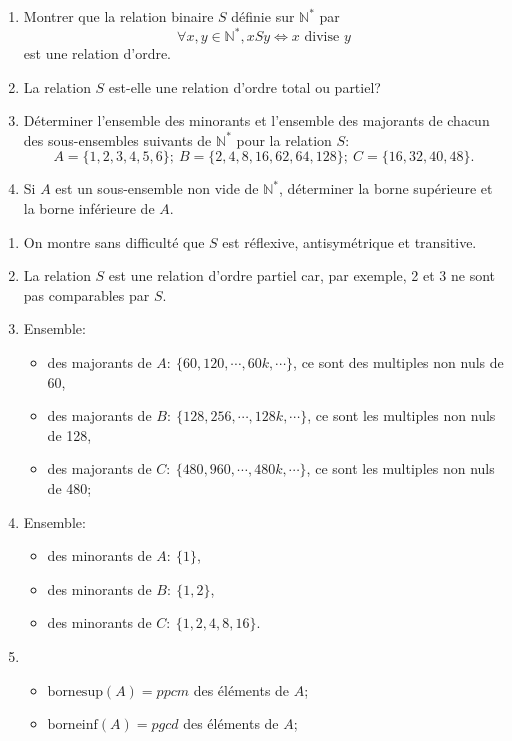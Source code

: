 \begin{exercise}[from=Devoir SR MPI 2010]
    \begin{enumerate}
        \item Montrer que la relation binaire $S$ définie sur $\mathbb{N}^*$ par
        \begin{equation*}
            \forall x,y \in \mathbb{N}^*, xSy \Longleftrightarrow x \text{ divise } y
        \end{equation*}
        est une relation d'ordre.
        \item La relation $S$ est-elle une relation d'ordre total ou partiel?
        \item Déterminer l'ensemble des minorants et l'ensemble  des majorants de chacun des sous-ensembles suivants de $\mathbb{N}^*$ pour la relation $S$:
        \begin{equation*}
            A=\{1,2,3,4,5,6\}; \ B=\{2,4,8,16,62,64,128\}; \ C=\{16,32,40,48\}.
        \end{equation*}
        \item Si $A$ est un sous-ensemble non vide de $\mathbb{N}^*$, déterminer la borne supérieure et la borne inférieure de $A$.
    \end{enumerate}

    \cor
    \begin{enumerate}
        \item On montre sans difficulté que $S$ est réflexive, antisymétrique et transitive.
        \item La relation $S$ est une relation d'ordre partiel car, par exemple, 2 et 3 ne sont pas comparables par $S$.
        \item Ensemble: \begin{itemize}
            \item des majorants de $A:\ \{60, 120, \cdots, 60k, \cdots\}$, ce sont des multiples non nuls de 60,
            \item des majorants de $B:\ \{128, 256, \cdots, 128k, \cdots\}$, ce sont les multiples non nuls de 128,
            \item des majorants de $C:\ \{480, 960, \cdots, 480k, \cdots\}$, ce sont les multiples non nuls de 480;
        \end{itemize}
        \item Ensemble: \begin{itemize}
            \item des minorants de $A:\ \{1\}$,
            \item des minorants de $B:\ \{1, 2\}$,
            \item des minorants de $C:\ \{1, 2, 4, 8, 16\}$.
        \end{itemize}
        \item \begin{itemize}
            \item  $\text{bornesup}(A)=ppcm$ des éléments de $A$;
            \item  $\text{borneinf}(A)=pgcd$ des éléments de $A$;
        \end{itemize}
    \end{enumerate}
\end{exercise}

